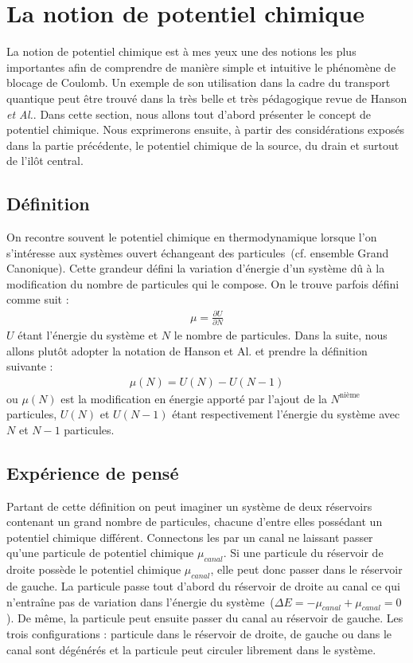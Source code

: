 \section{La notion de potentiel chimique}
La notion de potentiel chimique est à mes yeux une des notions les plus importantes afin de comprendre de manière simple et intuitive le phénomène de blocage de Coulomb. Un exemple de son utilisation dans la cadre du transport quantique peut \^etre trouvé dans la très belle et très pédagogique revue de Hanson \textit{et Al.}. Dans cette section, nous allons tout d'abord présenter le concept de potentiel chimique. Nous exprimerons ensuite, à partir des considérations exposés dans la partie précédente, le potentiel chimique de la source, du drain et surtout de l'ilôt central.

\subsection{Définition}

On recontre souvent le potentiel chimique en thermodynamique lorsque l'on s'intéresse aux systèmes ouvert échangeant des particules~(cf. ensemble Grand Canonique). Cette grandeur défini la variation d'énergie d'un système d\^u à la modification du nombre de particules qui le compose. On le trouve parfois défini comme suit :
\begin{eqnarray}
\mu = \frac{\partial U}{\partial N} \nonumber
\end{eqnarray}
$U$ étant l'énergie du système et $N$ le nombre de particules. Dans la suite, nous allons plut\^ot adopter la notation de Hanson et Al. et prendre la définition suivante :
\begin{eqnarray}
\mu(N) = U(N) - U(N-1)
\end{eqnarray}
ou $\mu(N)$ est la modification en énergie apporté par l'ajout de la $N^\text{nième}$ particules, $U(N)$ et $U(N-1)$ étant respectivement l'énergie du système avec $N$ et $N-1$ particules.

\subsection{Expérience de pensé}

Partant de cette définition on peut imaginer un système de deux réservoirs contenant un grand nombre de particules, chacune d'entre elles possédant un potentiel chimique différent. Connectons les par un canal ne laissant passer qu'une particule de potentiel chimique $\mu_{canal}$. Si une particule du réservoir de droite possède le potentiel chimique $\mu_{canal}$, elle peut donc passer dans le réservoir de gauche. La particule passe tout d'abord du réservoir de droite au canal ce qui n'entra\^ine pas de variation dans l'énergie du système~($\Delta E = -\mu_{canal} + \mu_{canal} = 0$). De m\^eme, la particule peut ensuite passer du canal au réservoir de gauche. Les trois configurations : particule dans le réservoir de droite, de gauche ou dans le canal sont dégénérés et la particule peut circuler librement dans le système.

